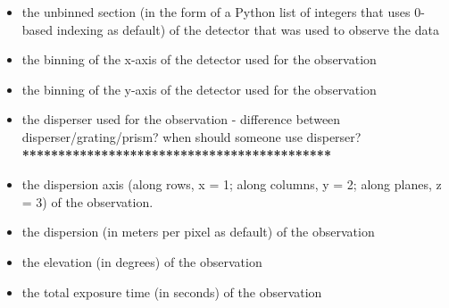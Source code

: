 \documentclass[letterpaper,10pt,english]{sphinxmanual}
\begin{document}
\begin{itemize}
\item {} 
the unbinned section (in the form of a Python list of integers that uses
0-based indexing as default) of the detector that was used to observe the
data

\end{itemize}

\begin{itemize}
\item {} 
the binning of the x-axis of the detector used for the observation

\end{itemize}

\begin{itemize}
\item {} 
the binning of the y-axis of the detector used for the observation

\end{itemize}

\begin{itemize}
\item {} 
the disperser used for the observation - difference between
disperser/grating/prism? when should someone use disperser? \textbf{*******************************************}

\end{itemize}

\begin{itemize}
\item {} 
the dispersion axis (along rows, x = 1; along columns, y = 2; along planes,
z = 3) of the observation.

\end{itemize}

\begin{itemize}
\item {} 
the dispersion (in meters per pixel as default) of the observation

\end{itemize}

\begin{itemize}
\item {} 
the elevation (in degrees) of the observation

\end{itemize}

\begin{itemize}
\item {} 
the total exposure time (in seconds) of the observation

\end{itemize}
\end{document}
